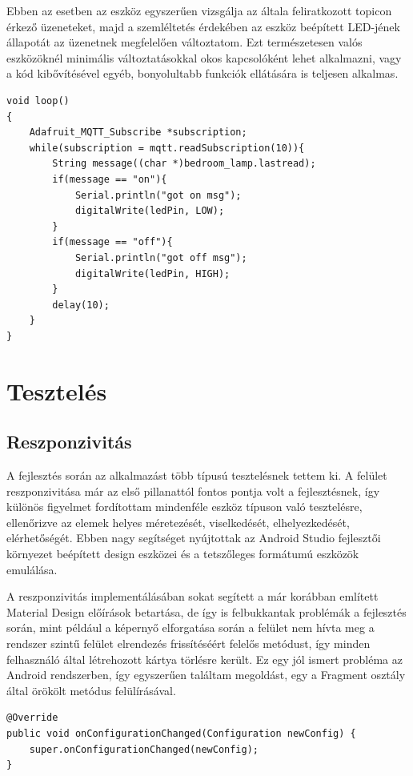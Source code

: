 \documentclass[]{thesis-ekf}
\theoremstyle{definition}
\theoremstyle{remark}
\begin{document}
Ebben az esetben az eszköz egyszerűen vizsgálja az általa feliratkozott topicon érkező
üzeneteket, majd a szemléltetés érdekében az eszköz beépített LED-jének állapotát az üzenetnek megfelelően változtatom.
Ezt természetesen valós eszközöknél minimális változtatásokkal okos kapcsolóként lehet alkalmazni, vagy a kód kibővítésével
egyéb, bonyolultabb funkciók ellátására is teljesen alkalmas.

\lstset{language=C++}
\begin{lstlisting}[frame=single]
void loop() 
{
	Adafruit_MQTT_Subscribe *subscription; 
	while(subscription = mqtt.readSubscription(10)){
		String message((char *)bedroom_lamp.lastread);
		if(message == "on"){
			Serial.println("got on msg");
			digitalWrite(ledPin, LOW);
		}
		if(message == "off"){
			Serial.println("got off msg");
			digitalWrite(ledPin, HIGH);
		}     
		delay(10);
	}
}
\end{lstlisting}

\section{Tesztelés}

\subsection{Reszponzivitás}
A fejlesztés során az alkalmazást több típusú tesztelésnek tettem ki. A felület reszponzivitása már az első pillanattól
fontos pontja volt a fejlesztésnek, így különös figyelmet fordítottam mindenféle eszköz típuson való tesztelésre, ellenőrizve
az elemek helyes méretezését, viselkedését, elhelyezkedését, elérhetőségét. Ebben nagy segítséget nyújtottak az 
Android Studio fejlesztői környezet beépített design eszközei és a tetszőleges formátumú eszközök emulálása. 

A reszponzivitás implementálásában sokat segített a már korábban említett Material Design\cite{material} előírások betartása,
de így is felbukkantak problémák a fejlesztés során, mint például a képernyő elforgatása során a felület 
nem hívta meg a rendszer szintű felület elrendezés frissítéséért felelős metódust, 
így minden felhasználó által létrehozott kártya törlésre került. Ez egy jól ismert probléma az Android rendszerben, 
így egyszerűen találtam megoldást, egy a Fragment osztály által örökölt metódus felülírásával.

\lstset{language=Java}  
\begin{lstlisting}[frame=single]
@Override
public void onConfigurationChanged(Configuration newConfig) {
	super.onConfigurationChanged(newConfig);
}
\end{lstlisting}
\end{document}

